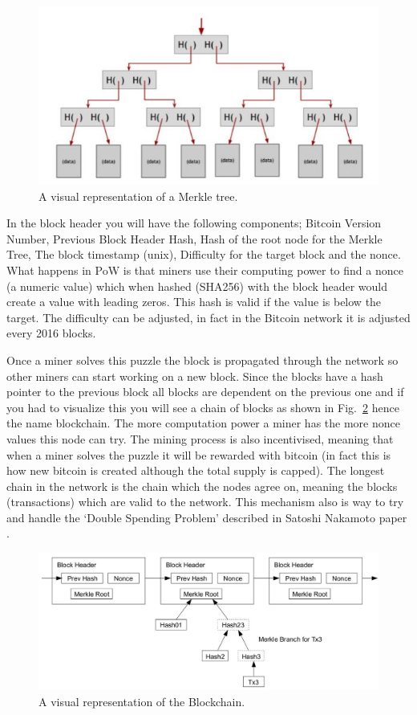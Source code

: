 \begin{figure}[H]
\centering
  \includegraphics[scale = .70]{imgs/merkle_tree.JPG}
  \caption{A visual representation of a Merkle tree.}
  \label{fig:pow_1}
\end{figure}

\noindent
In the block header you will have the following components; Bitcoin Version Number, Previous Block Header Hash, Hash of the root node for the Merkle Tree, The block timestamp (unix), Difficulty for the target block and the nonce. What happens in PoW is that miners use their computing power to find a nonce (a numeric value) which when hashed (SHA256) with the block header would create a value with leading zeros.  This hash is valid if the value is below the target. The difficulty can be adjusted, in fact in the Bitcoin network it is adjusted every 2016 blocks. 

\noindent
Once a miner solves this puzzle the block is propagated through the network so other miners can start working on a new block. Since the blocks have a hash pointer to the previous block all blocks are dependent on the previous one and if you had to visualize this you will see a chain of blocks as shown in Fig.~\ref{fig:pow_2} hence the name blockchain. The more computation power a miner has the more nonce values this node can try. The mining process is also incentivised, meaning that when a miner solves the puzzle it will be rewarded with bitcoin (in fact this is how new bitcoin is created although the total supply is capped). The longest chain in the network is the chain which the nodes agree on, meaning the blocks (transactions) which are valid to the network. This mechanism also is way to try and handle the ‘Double Spending Problem’ described in Satoshi Nakamoto paper \cite{nakamoto2008bitcoin}. 

\begin{figure}[H]
\centering
  \includegraphics[scale = .50]{imgs/blockchain.JPG}
  \caption{A visual representation of the Blockchain.}
  \label{fig:pow_2}
\end{figure}

